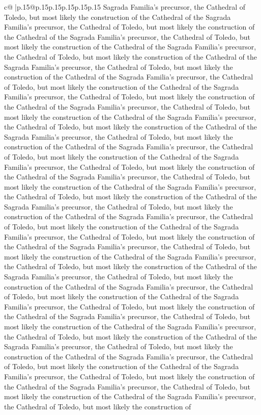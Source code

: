 \documentclass{article}
\begin{document}
{\begin{supertabular}{c@{$\;$}|p{.15\linewidth}@{}p{.15\linewidth}p{.15\linewidth}p{.15\linewidth}p{.15\linewidth}p{.15\linewidth}}
{{{Sagrada Familia's precursor, the Cathedral of Toledo, but most likely the construction of the Cathedral of the Sagrada Familia's precursor, the Cathedral of Toledo, but most likely the construction of the Cathedral of the Sagrada Familia's precursor, the Cathedral of Toledo, but most likely the construction of the Cathedral of the Sagrada Familia's precursor, the Cathedral of Toledo, but most likely the construction of the Cathedral of the Sagrada Familia's precursor, the Cathedral of Toledo, but most likely the construction of the Cathedral of the Sagrada Familia's precursor, the Cathedral of Toledo, but most likely the construction of the Cathedral of the Sagrada Familia's precursor, the Cathedral of Toledo, but most likely the construction of the Cathedral of the Sagrada Familia's precursor, the Cathedral of Toledo, but most likely the construction of the Cathedral of the Sagrada Familia's precursor, the Cathedral of Toledo, but most likely the construction of the Cathedral of the Sagrada Familia's precursor, the Cathedral of Toledo, but most likely the construction of the Cathedral of the Sagrada Familia's precursor, the Cathedral of Toledo, but most likely the construction of the Cathedral of the Sagrada Familia's precursor, the Cathedral of Toledo, but most likely the construction of the Cathedral of the Sagrada Familia's precursor, the Cathedral of Toledo, but most likely the construction of the Cathedral of the Sagrada Familia's precursor, the Cathedral of Toledo, but most likely the construction of the Cathedral of the Sagrada Familia's precursor, the Cathedral of Toledo, but most likely the construction of the Cathedral of the Sagrada Familia's precursor, the Cathedral of Toledo, but most likely the construction of the Cathedral of the Sagrada Familia's precursor, the Cathedral of Toledo, but most likely the construction of the Cathedral of the Sagrada Familia's precursor, the Cathedral of Toledo, but most likely the construction of the Cathedral of the Sagrada Familia's precursor, the Cathedral of Toledo, but most likely the construction of the Cathedral of the Sagrada Familia's precursor, the Cathedral of Toledo, but most likely the construction of the Cathedral of the Sagrada Familia's precursor, the Cathedral of Toledo, but most likely the construction of the Cathedral of the Sagrada Familia's precursor, the Cathedral of Toledo, but most likely the construction of the Cathedral of the Sagrada Familia's precursor, the Cathedral of Toledo, but most likely the construction of the Cathedral of the Sagrada Familia's precursor, the Cathedral of Toledo, but most likely the construction of the Cathedral of the Sagrada Familia's precursor, the Cathedral of Toledo, but most likely the construction of the Cathedral of the Sagrada Familia's precursor, the Cathedral of Toledo, but most likely the construction of the Cathedral of the Sagrada Familia's precursor, the Cathedral of Toledo, but most likely the construction of the Cathedral of the Sagrada Familia's precursor, the Cathedral of Toledo, but most likely the construction of the Cathedral of the Sagrada Familia's precursor, the Cathedral of Toledo, but most likely the construction of }}}
\end{supertabular}}
\end{document}
